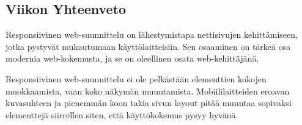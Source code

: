 \subsection*{Viikon Yhteenveto}


Responsiivinen web-suunnittelu on lähestymistapa nettisivujen kehittämiseen, jotka pystyvät mukautumaan käyttölaitteisiin. Sen osaaminen on tärkeä osa modernia web-kokemusta, ja se on oleellinen osata web-kehittäjänä.
\medskip


Responsiivinen web-suunnittelu ei ole pelkästään elementtien kokojen muokkaamista, vaan koko näkymän muuntamista.
Mobiililaitteiden eroavan kuvasuhteen ja pienemmän koon takia sivun layout pitää muuntaa sopivaksi elementtejä siirrellen siten, että käyttökokemus pysyy hyvänä. 

\newpage
